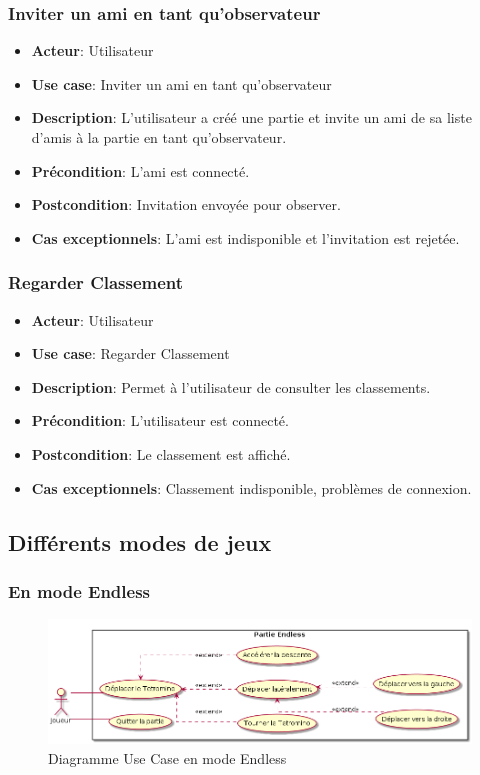 \documentclass{article}
\begin{document}
\subsubsection*{Inviter un ami en tant qu'observateur}
\begin{itemize}
    \item \textbf{Acteur}: Utilisateur
    \item \textbf{Use case}: Inviter un ami en tant qu'observateur
    \item \textbf{Description}: L'utilisateur a créé une partie et invite un ami de sa liste d'amis à la partie en tant qu'observateur.
    \item \textbf{Précondition}: L'ami est connecté.
    \item \textbf{Postcondition}: Invitation envoyée pour observer.
    \item \textbf{Cas exceptionnels}: L'ami est indisponible et l'invitation est rejetée.
\end{itemize}

\subsubsection*{Regarder Classement}
\begin{itemize}
    \item \textbf{Acteur}: Utilisateur
    \item \textbf{Use case}: Regarder Classement
    \item \textbf{Description}: Permet à l'utilisateur de consulter les classements.
    \item \textbf{Précondition}: L'utilisateur est connecté.
    \item \textbf{Postcondition}: Le classement est affiché.
    \item \textbf{Cas exceptionnels}: Classement indisponible, problèmes de connexion.
\end{itemize}

\newpage

\subsection{Différents modes de jeux}

\subsubsection{En mode Endless}

\begin{figure}[!h]
    \centering
    \includegraphics[width=1\textwidth]{../../res/uml/usecase/EndlessUseCase.png}
    \caption{Diagramme Use Case en mode Endless}
    \label{fig:Classique}
\end{figure}
\end{document}
